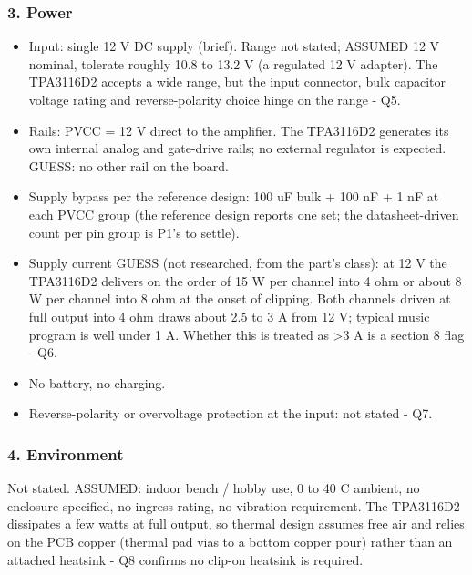 \documentclass[11pt]{article}
\begin{document}
\subsubsection*{3. Power}
\begin{itemize}
\item Input: single 12 V DC supply (brief). Range not stated; ASSUMED 12 V nominal, tolerate roughly
10.8 to 13.2 V (a regulated 12 V adapter). The TPA3116D2 accepts a wide range, but the input
connector, bulk capacitor voltage rating and reverse-polarity choice hinge on the range - Q5.
\item Rails: PVCC = 12 V direct to the amplifier. The TPA3116D2 generates its own internal analog and
gate-drive rails; no external regulator is expected. GUESS: no other rail on the board.
\item Supply bypass per the reference design: 100 uF bulk + 100 nF + 1 nF at each PVCC group (the reference design reports one set;
the datasheet-driven count per pin group is P1's to settle).
\item Supply current GUESS (not researched, from the part's class): at 12 V the TPA3116D2 delivers on
the order of 15 W per channel into 4 ohm or about 8 W per channel into 8 ohm at the onset of
clipping. Both channels driven at full output into 4 ohm draws about 2.5 to 3 A from 12 V;
typical music program is well under 1 A. Whether this is treated as \textgreater{}3 A is a section 8 flag - Q6.
\item No battery, no charging.
\item Reverse-polarity or overvoltage protection at the input: not stated - Q7.
\end{itemize}
\subsubsection*{4. Environment}
Not stated. ASSUMED: indoor bench / hobby use, 0 to 40 C ambient, no enclosure specified, no ingress rating, no vibration requirement. The TPA3116D2 dissipates a few watts at full output, so thermal design assumes free air and relies on the PCB copper (thermal pad vias to a bottom copper pour) rather than an attached heatsink - Q8 confirms no clip-on heatsink is required.
\end{document}
